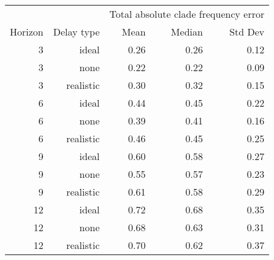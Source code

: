 
\begin{tabular*}{0.7\textwidth}{rrrrr}
\toprule
        &            & \multicolumn{3}{c}{Total absolute clade frequency error} \\
Horizon & Delay type & Mean & Median & Std Dev \\
\midrule

3 & ideal & 0.26 & 0.26 & 0.12 \\
3 & none & 0.22 & 0.22 & 0.09 \\
3 & realistic & 0.30 & 0.32 & 0.15 \\
6 & ideal & 0.44 & 0.45 & 0.22 \\
6 & none & 0.39 & 0.41 & 0.16 \\
6 & realistic & 0.46 & 0.45 & 0.25 \\
9 & ideal & 0.60 & 0.58 & 0.27 \\
9 & none & 0.55 & 0.57 & 0.23 \\
9 & realistic & 0.61 & 0.58 & 0.29 \\
12 & ideal & 0.72 & 0.68 & 0.35 \\
12 & none & 0.68 & 0.63 & 0.31 \\
12 & realistic & 0.70 & 0.62 & 0.37 \\

\bottomrule
\end{tabular*}

